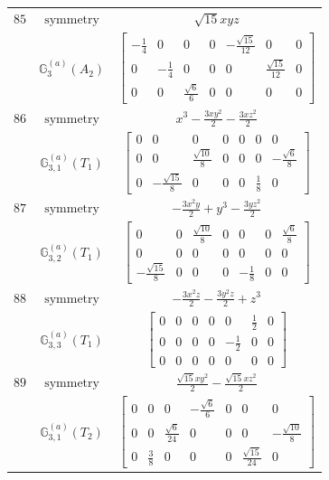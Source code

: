 \documentclass[fleqn,8pt,landscape]{jsarticle}
\begin{document}
\begin{longtable}{ccc}
$ 85 $ & $ \text{symmetry} $ & $ \sqrt{15} x y z $ \\
$  $ & $ \mathbb{G}_{3}^{(a)}(A_{2}) $ & $ \begin{bmatrix} - \frac{1}{4} & 0 & 0 & 0 & - \frac{\sqrt{15}}{12} & 0 & 0 \\ 0 & - \frac{1}{4} & 0 & 0 & 0 & \frac{\sqrt{15}}{12} & 0 \\ 0 & 0 & \frac{\sqrt{6}}{6} & 0 & 0 & 0 & 0 \end{bmatrix} $ \\ \hline
$ 86 $ & $ \text{symmetry} $ & $ x^{3} - \frac{3 x y^{2}}{2} - \frac{3 x z^{2}}{2} $ \\
$  $ & $ \mathbb{G}_{3,1}^{(a)}(T_{1}) $ & $ \begin{bmatrix} 0 & 0 & 0 & 0 & 0 & 0 & 0 \\ 0 & 0 & \frac{\sqrt{10}}{8} & 0 & 0 & 0 & - \frac{\sqrt{6}}{8} \\ 0 & - \frac{\sqrt{15}}{8} & 0 & 0 & 0 & \frac{1}{8} & 0 \end{bmatrix} $ \\ \hline
$ 87 $ & $ \text{symmetry} $ & $ - \frac{3 x^{2} y}{2} + y^{3} - \frac{3 y z^{2}}{2} $ \\
$  $ & $ \mathbb{G}_{3,2}^{(a)}(T_{1}) $ & $ \begin{bmatrix} 0 & 0 & \frac{\sqrt{10}}{8} & 0 & 0 & 0 & \frac{\sqrt{6}}{8} \\ 0 & 0 & 0 & 0 & 0 & 0 & 0 \\ - \frac{\sqrt{15}}{8} & 0 & 0 & 0 & - \frac{1}{8} & 0 & 0 \end{bmatrix} $ \\ \hline
$ 88 $ & $ \text{symmetry} $ & $ - \frac{3 x^{2} z}{2} - \frac{3 y^{2} z}{2} + z^{3} $ \\
$  $ & $ \mathbb{G}_{3,3}^{(a)}(T_{1}) $ & $ \begin{bmatrix} 0 & 0 & 0 & 0 & 0 & \frac{1}{2} & 0 \\ 0 & 0 & 0 & 0 & - \frac{1}{2} & 0 & 0 \\ 0 & 0 & 0 & 0 & 0 & 0 & 0 \end{bmatrix} $ \\ \hline
$ 89 $ & $ \text{symmetry} $ & $ \frac{\sqrt{15} x y^{2}}{2} - \frac{\sqrt{15} x z^{2}}{2} $ \\
$  $ & $ \mathbb{G}_{3,1}^{(a)}(T_{2}) $ & $ \begin{bmatrix} 0 & 0 & 0 & - \frac{\sqrt{6}}{6} & 0 & 0 & 0 \\ 0 & 0 & \frac{\sqrt{6}}{24} & 0 & 0 & 0 & - \frac{\sqrt{10}}{8} \\ 0 & \frac{3}{8} & 0 & 0 & 0 & \frac{\sqrt{15}}{24} & 0 \end{bmatrix} $ \\ \hline

\end{longtable}
\end{document}
